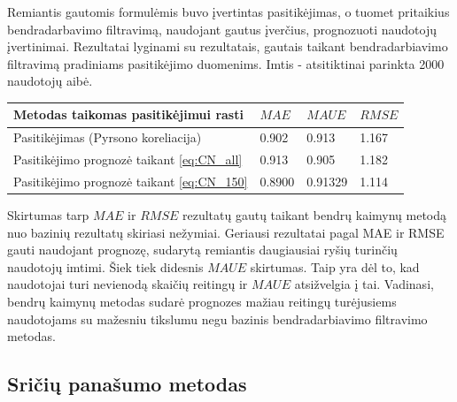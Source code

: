 \documentclass{VUMIFInfMagistrinis}
\begin{document}
\newline
\indent
Remiantis gautomis formulėmis buvo įvertintas pasitikėjimas, o tuomet pritaikius bendradarbavimo filtravimą, naudojant gautus įverčius, prognozuoti naudotojų įvertinimai. Rezultatai lyginami su rezultatais, gautais taikant bendradarbiavimo filtravimą pradiniams pasitikėjimo duomenims. Imtis - atsitiktinai parinkta 2000 naudotojų aibė. 
\begin{center}
	\begin{tabular}{ | l | l | l | l | }
		\hline
		Metodas taikomas pasitikėjimui rasti & $MAE$ & $MAUE$ & $RMSE$\\ \hline
		 Pasitikėjimas (Pyrsono koreliacija)        & 0.902 & 0.913 & 1.167  \\ \hline
		 Pasitikėjimo prognozė taikant \ref{eq:CN_all}	  					& 0.913 & 0.905 & 1.182  \\ \hline
		 Pasitikėjimo prognozė taikant \ref{eq:CN_150} 					& 0.8900 & 0.91329 & 1.114  \\ \hline
		\hline
	\end{tabular}
\end{center}

Skirtumas tarp $MAE$ ir $RMSE$ rezultatų gautų taikant bendrų kaimynų metodą nuo bazinių rezultatų skiriasi nežymiai. Geriausi rezultatai pagal MAE ir RMSE gauti naudojant prognozę, sudarytą remiantis daugiausiai ryšių turinčių naudotojų imtimi. Šiek tiek didesnis $MAUE$ skirtumas. Taip yra dėl to, kad naudotojai turi nevienodą skaičių reitingų ir $MAUE$ atsižvelgia į tai. Vadinasi, bendrų kaimynų metodas sudarė prognozes mažiau reitingų turėjusiems naudotojams su mažesniu tikslumu negu bazinis bendradarbiavimo filtravimo metodas.



\subsection{Sričių panašumo metodas}
\end{document}
